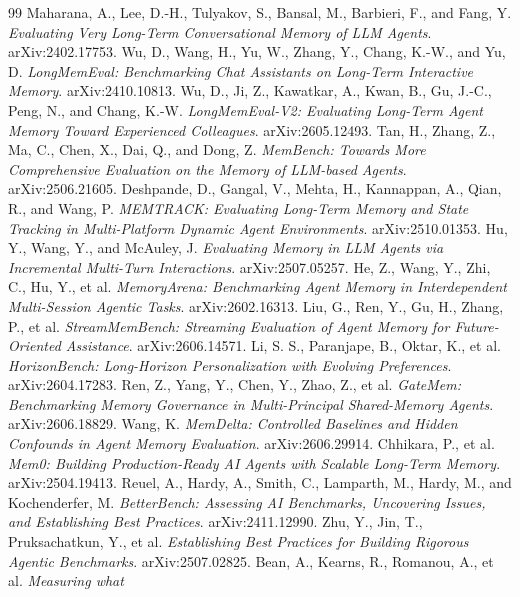 \documentclass[11pt]{article}
\begin{document}
\begin{thebibliography}{99}
\footnotesize
\setlength{\itemsep}{0pt}\setlength{\parsep}{0pt}
 Maharana, A., Lee, D.-H., Tulyakov, S., Bansal, M., Barbieri, F.,
and Fang, Y. \emph{Evaluating Very Long-Term Conversational Memory of LLM Agents}.
arXiv:2402.17753.
 Wu, D., Wang, H., Yu, W., Zhang, Y., Chang, K.-W., and Yu, D.
\emph{LongMemEval: Benchmarking Chat Assistants on Long-Term Interactive Memory}.
arXiv:2410.10813.
 Wu, D., Ji, Z., Kawatkar, A., Kwan, B., Gu, J.-C., Peng, N.,
and Chang, K.-W. \emph{LongMemEval-V2: Evaluating Long-Term Agent Memory Toward
Experienced Colleagues}. arXiv:2605.12493.
 Tan, H., Zhang, Z., Ma, C., Chen, X., Dai, Q., and Dong, Z.
\emph{MemBench: Towards More Comprehensive Evaluation on the Memory of LLM-based
Agents}. arXiv:2506.21605.
 Deshpande, D., Gangal, V., Mehta, H., Kannappan, A., Qian, R.,
and Wang, P. \emph{MEMTRACK: Evaluating Long-Term Memory and State Tracking in
Multi-Platform Dynamic Agent Environments}. arXiv:2510.01353.
 Hu, Y., Wang, Y., and McAuley, J. \emph{Evaluating Memory
in LLM Agents via Incremental Multi-Turn Interactions}. arXiv:2507.05257.
 He, Z., Wang, Y., Zhi, C., Hu, Y., et al. \emph{MemoryArena:
Benchmarking Agent Memory in Interdependent Multi-Session Agentic Tasks}.
arXiv:2602.16313.
 Liu, G., Ren, Y., Gu, H., Zhang, P., et al.
\emph{StreamMemBench: Streaming Evaluation of Agent Memory for Future-Oriented
Assistance}. arXiv:2606.14571.
 Li, S. S., Paranjape, B., Oktar, K., et al. \emph{HorizonBench:
Long-Horizon Personalization with Evolving Preferences}. arXiv:2604.17283.
 Ren, Z., Yang, Y., Chen, Y., Zhao, Z., et al. \emph{GateMem:
Benchmarking Memory Governance in Multi-Principal Shared-Memory Agents}.
arXiv:2606.18829.
 Wang, K. \emph{MemDelta: Controlled Baselines and Hidden
Confounds in Agent Memory Evaluation}. arXiv:2606.29914.
 Chhikara, P., et al. \emph{Mem0: Building Production-Ready AI Agents
with Scalable Long-Term Memory}. arXiv:2504.19413.
 Reuel, A., Hardy, A., Smith, C., Lamparth, M., Hardy, M., and
Kochenderfer, M. \emph{BetterBench: Assessing AI Benchmarks, Uncovering Issues, and
Establishing Best Practices}. arXiv:2411.12990.
 Zhu, Y., Jin, T., Pruksachatkun, Y., et al. \emph{Establishing Best
Practices for Building Rigorous Agentic Benchmarks}. arXiv:2507.02825.
 Bean, A., Kearns, R., Romanou, A., et al. \emph{Measuring what
}
\end{thebibliography}
\end{document}
